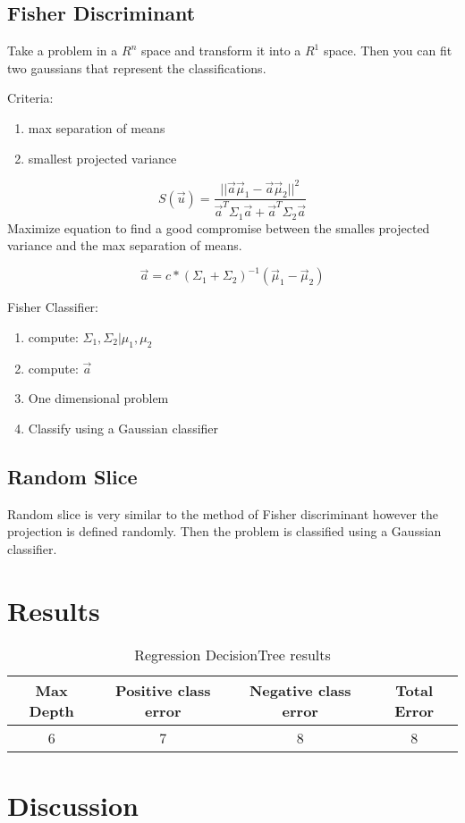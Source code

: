 \documentclass[letterpaper]{article}
\begin{document}
\subsection{Fisher Discriminant}
Take a problem in a $R^n$ space and transform it into a $R^1$ space. Then you can fit two gaussians that represent the classifications.

Criteria:
\begin{enumerate}
\item max separation of means
\item smallest projected variance
\end{enumerate}

\begin{equation}
S(\vec{u}) = \frac{||\vec{a} \vec{\mu}_1 - \vec{a} \vec{\mu}_2||^2}{\vec{a}^T \Sigma_1 \vec{a} + \vec{a}^T \Sigma_2 \vec{a}}
\end{equation}
Maximize equation to find a good compromise between the smalles projected variance and the max separation of means.

\begin{equation}
\vec{a} = c * (\Sigma_1 + \Sigma_2)^{-1} (\vec{\mu}_1 - \vec{\mu}_2)
\end{equation}

Fisher Classifier:
\begin{enumerate}
\item compute: $\Sigma_1, \Sigma_2 | \mu_1, \mu_2$
\item compute: $\vec{a}$
\item One dimensional problem
\item Classify using a Gaussian classifier
\end{enumerate}

\subsection{Random Slice}
Random slice is very similar to the method of Fisher discriminant however the projection is defined randomly. Then the problem is classified using a Gaussian classifier.

\section{Results}
\begin{table}
\label{tab:regression}
\caption{Regression DecisionTree results}
\centering
\begin{tabular}{|c|c|c|c|}
 \hline
Max Depth & Positive class error & Negative class error & Total Error \\ \hline
6 & 7 & 8 & 8\\ \hline
\end{tabular}
\end{table}
\section{Discussion}
\end{document}
